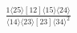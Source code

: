 \documentclass[varwidth, border=5pt]{standalone}
\begin{document}
\begin{my}
$\begin{gathered}
\scriptscriptstyle\frac{1⟨25⟩[12]⟨15⟩⟨24⟩}{⟨14⟩⟨23⟩[23]⟨34⟩^2}
\end{gathered}$
\end{my}
\end{document}
